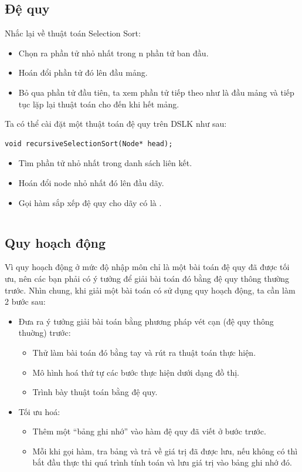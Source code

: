\documentclass[main.tex]{subfiles}
\begin{document}
\subsection{Đệ quy}
Nhắc lại về thuật toán Selection Sort:
\begin{itemize}
	\item Chọn ra phần tử nhỏ nhất trong n phần tử ban đầu.
	\item Hoán đổi phần tử đó lên đầu mảng.
	\item Bỏ qua phần tử đầu tiên, ta xem phần tử tiếp theo như là đầu mảng và tiếp tục lặp lại thuật toán cho đến khi hết mảng.
\end{itemize}

Ta có thể cài đặt một thuật toán đệ quy trên DSLK như sau:

\begin{verbatim}
void recursiveSelectionSort(Node* head);
\end{verbatim}

\begin{itemize}
	\item Tìm phần tử nhỏ nhất trong danh sách liên kết.
	\item Hoán đổi node nhỏ nhất đó lên đầu dãy.
	\item Gọi hàm sắp xếp đệ quy cho dãy có  là .
\end{itemize}

\inputminted[linenos]{cpp}{answer_sources/DeQuy.cpp}

\subsection{Quy hoạch động}
Vì quy hoạch động ở mức độ nhập môn chỉ là một bài toán đệ quy đã được tối ưu, nên các bạn phải có ý tưởng để giải bài toán đó bằng đệ quy thông thường trước. Nhìn chung, khi giải một bài toán có sử dụng quy hoạch động, ta cần làm 2 bước sau:
\begin{itemize}
	\item Đưa ra ý tưởng giải bài toán bằng phương pháp vét cạn (đệ quy thông thuờng) trước:
		\begin{itemize}
			\item Thử làm bài toán đó bằng tay và rút ra thuật toán thực hiện.
			\item Mô hình hoá thứ tự các bước thực hiện dưới dạng đồ thị.
			\item Trình bày thuật toán bằng đệ quy.
		\end{itemize}
	\item Tối ưu hoá:
		\begin{itemize}
			\item Thêm một ``bảng ghi nhớ'' vào hàm đệ quy đã viết ở bước trước.
			\item Mỗi khi gọi hàm, tra bảng và trả về giá trị đã được lưu, nếu không có thì bắt đầu thực thi quá trình tính toán và lưu giá trị vào bảng ghi nhớ đó.
		\end{itemize}
\end{itemize}
\end{document}
